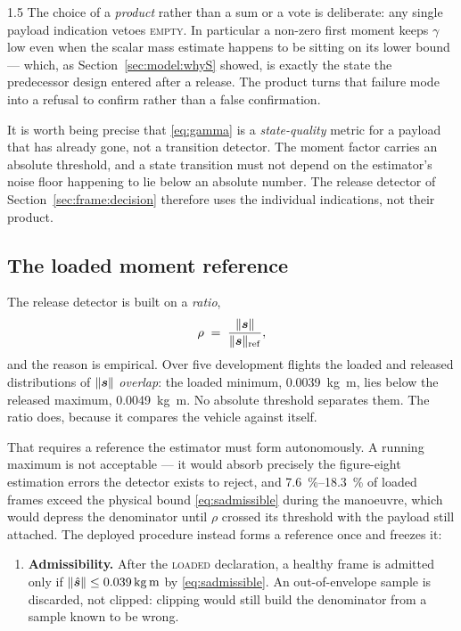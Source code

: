 \begin{spacing}{1.5}
The choice of a \emph{product} rather than a sum or a vote is deliberate: any
single payload indication vetoes \textsc{empty}. In particular a non-zero first
moment keeps $\gamma$ low even when the scalar mass estimate happens to be
sitting on its lower bound --- which, as Section~\ref{sec:model:whyS} showed, is
exactly the state the predecessor design entered after a release. The product
turns that failure mode into a refusal to confirm rather than a false
confirmation.

It is worth being precise that \eqref{eq:gamma} is a \emph{state-quality} metric
for a payload that has already gone, not a transition detector. The moment factor
carries an absolute threshold, and a state transition must not depend on the
estimator's noise floor happening to lie below an absolute number. The release
detector of Section~\ref{sec:frame:decision} therefore uses the individual
indications, not their product.

\subsection{The loaded moment reference}\label{sec:frame:momentref}

The release detector is built on a \emph{ratio},
\begin{equation}
\rho \;=\; \frac{\lVert\bm{s}\rVert}{\lVert\bm{s}\rVert_{\mathrm{ref}}},
\label{eq:rho}
\end{equation}
and the reason is empirical. Over five development flights the loaded and
released distributions of $\lVert\bm{s}\rVert$ \emph{overlap}: the loaded minimum,
\SI{0.0039}{\kg\meter}, lies below the released maximum,
\SI{0.0049}{\kg\meter}. No absolute threshold separates them. The ratio does,
because it compares the vehicle against itself.

That requires a reference the estimator must form autonomously. A running maximum
is not acceptable --- it would absorb precisely the figure-eight estimation
errors the detector exists to reject, and \SIrange{7.6}{18.3}{\percent} of loaded
frames exceed the physical bound \eqref{eq:sadmissible} during the manoeuvre,
which would depress the denominator until $\rho$ crossed its threshold with the
payload still attached. The deployed procedure instead forms a reference once and
freezes it:

\begin{enumerate}
\item \textbf{Admissibility.} After the \textsc{loaded} declaration, a healthy
frame is admitted only if $\lVert\hat\svec\rVert\le\SI{0.039}{\kg\meter}$ by
\eqref{eq:sadmissible}. An out-of-envelope sample is discarded, not clipped:
clipping would still build the denominator from a sample known to be wrong.


\end{enumerate}
\end{spacing}
